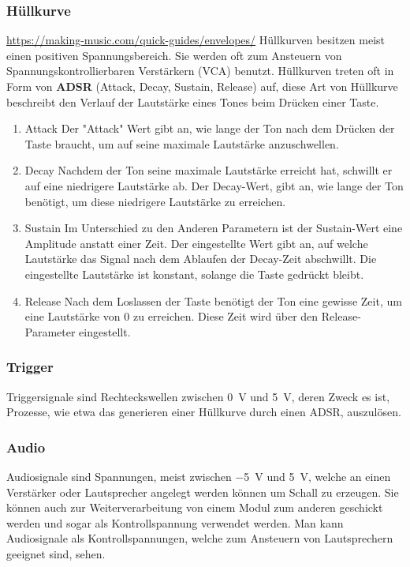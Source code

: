 \subsubsection{Hüllkurve}
\label{sec:orgd828ffc}
\url{https://making-music.com/quick-guides/envelopes/}
Hüllkurven besitzen meist einen positiven Spannungsbereich. Sie werden oft zum Ansteuern von Spannungskontrollierbaren Verstärkern (VCA) benutzt. Hüllkurven treten oft in Form von \textbf{ADSR} (Attack, Decay, Sustain, Release) auf, diese Art von Hüllkurve beschreibt den Verlauf der Lautstärke eines Tones beim Drücken einer Taste.

\begin{enumerate}
\item Attack
\label{sec:org106ca02}
Der "Attack" Wert gibt an, wie lange der Ton nach dem Drücken der Taste braucht, um auf seine maximale Lautstärke anzuschwellen.

\item Decay
\label{sec:org4fb139b}
Nachdem der Ton seine maximale Lautstärke erreicht hat, schwillt er auf eine niedrigere Lautstärke ab. Der Decay-Wert, gibt an, wie lange der Ton benötigt, um diese niedrigere Lautstärke zu erreichen.

\item Sustain
\label{sec:orgf41ac09}
Im Unterschied zu den Anderen Parametern ist der Sustain-Wert eine Amplitude anstatt einer Zeit. Der eingestellte Wert gibt an, auf welche Lautstärke das Signal nach dem Ablaufen der Decay-Zeit abschwillt. Die eingestellte Lautstärke ist konstant, solange die Taste gedrückt bleibt.

\item Release
\label{sec:orgcd61240}
Nach dem Loslassen der Taste benötigt der Ton eine gewisse Zeit, um eine Lautstärke von 0 zu erreichen. Diese Zeit wird über den Release-Parameter eingestellt.
\end{enumerate}

\subsubsection{Trigger}
\label{sec:org6365e66}
Triggersignale sind Rechteckswellen zwischen \SI{0}{\volt} und \SI{5}{\volt}, deren Zweck es ist, Prozesse, wie etwa das generieren einer Hüllkurve durch einen ADSR, auszulösen.

\subsubsection{Audio}
\label{sec:org36fbaa7}
Audiosignale sind Spannungen, meist zwischen \SI{-5}{\volt} und \SI{5}{\volt}, welche an einen Verstärker oder Lautsprecher angelegt werden können um Schall zu erzeugen. Sie können auch zur Weiterverarbeitung von einem Modul zum anderen geschickt werden und sogar als Kontrollspannung verwendet werden. Man kann Audiosignale als Kontrollspannungen, welche zum Ansteuern von Lautsprechern geeignet sind, sehen.
